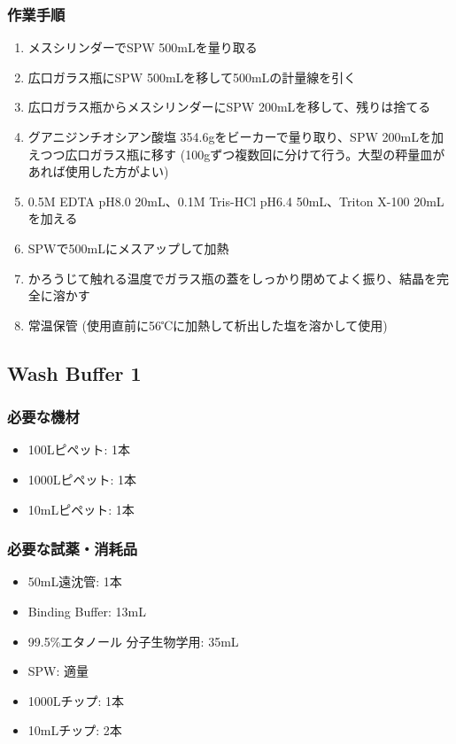 \documentclass[titlepage,10pt,a4paper,uplatex]{jsbook}
\begin{document}
\subsubsection{作業手順}
\begin{enumerate}
\item メスシリンダーでSPW 500mLを量り取る
\item 広口ガラス瓶にSPW 500mLを移して500mLの計量線を引く
\item 広口ガラス瓶からメスシリンダーにSPW 200mLを移して、残りは捨てる
\item グアニジンチオシアン酸塩 354.6gをビーカーで量り取り、SPW 200mLを加えつつ広口ガラス瓶に移す (100gずつ複数回に分けて行う。大型の秤量皿があれば使用した方がよい)
\item 0.5M EDTA pH8.0 20mL、0.1M Tris-HCl pH6.4 50mL、Triton X-100 20mLを加える
\item SPWで500mLにメスアップして加熱
\item かろうじて触れる温度でガラス瓶の蓋をしっかり閉めてよく振り、結晶を完全に溶かす
\item 常温保管 (使用直前に56℃に加熱して析出した塩を溶かして使用)
\end{enumerate}

\subsection{Wash Buffer 1}

\subsubsection{必要な機材}
\begin{itemize}
\item 100{\textmu}Lピペット: 1本
\item 1000{\textmu}Lピペット: 1本
\item 10mLピペット: 1本
\end{itemize}

\subsubsection{必要な試薬・消耗品}
\begin{itemize}
\item 50mL遠沈管: 1本
\item Binding Buffer: 13mL
\item 99.5\%エタノール 分子生物学用: 35mL
\item SPW: 適量
\item 1000{\textmu}Lチップ: 1本
\item 10mLチップ: 2本
\end{itemize}
\end{document}
